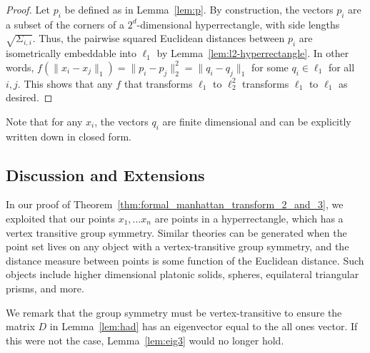 \begin{proof}  
  Let $p_i$ be defined as in Lemma~\ref{lem:p}.  By construction, the
  vectors $p_i$ are a subset of the corners of a $2^d$-dimensional hyperrectangle, with side
 lengths $\sqrt{\Sigma_{i,i}}$. Thus, the
 pairwise squared Euclidean distances between $p_i$ are isometrically
 embeddable into $\ell_1$ by Lemma~\ref{lem:l2-hyperrectangle}. In other words, $f(\|x_i - x_j\|_1) = \|p_i -
 p_j \|_2^2 = \|q_i -
 q_j\|_1$ for some $q_i \in \ell_1$ for all $i, j$. This shows that any $f$ that transforms $\ell_1$ to
 $\ell_2^2$ transforms $\ell_1$ to $\ell_1$ as
 desired.
 \end{proof}


Note that for any $x_i$, the vectors $q_i$ are finite dimensional and
can be explicitly written down in closed form.










\subsection{Discussion and Extensions}\label{sec:manhattan_transform23:discussion}
In our proof of Theorem~\ref{thm:formal_manhattan_transform_2_and_3}, we exploited that our points $x_1, \ldots x_n$ are points
in a hyperrectangle, which has a vertex transitive group symmetry. Similar theories
can be generated when the point set lives on any object with a
vertex-transitive group symmetry, and the distance measure between
points is some function of the Euclidean distance. Such objects include higher dimensional
platonic solids, spheres, equilateral triangular prisms, and more.

We remark that the group symmetry must be vertex-transitive to ensure the matrix $D$ in Lemma~\ref{lem:had} has an eigenvector equal to the all ones vector. If
this were not the case, Lemma~\ref{lem:eig3} would no longer hold. 





